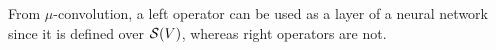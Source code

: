 



From $\mu$-convolution, a left operator can be used as a layer of a neural network since it is defined over $\mathcal{S}(V)$, whereas right operators are not. 

